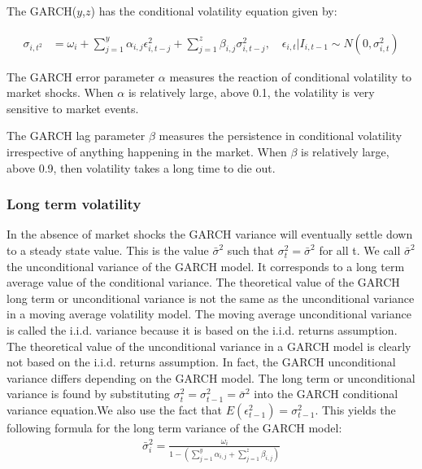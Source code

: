 The GARCH($y$,$z$) has the conditional volatility equation given by:

\begin{align}
    \sigma_{i,t^2} &= \omega_i + \sum_{j=1}^y\alpha_{i,j}\epsilon_{i,t-j}^2+\sum_{j=1}^z\beta_{i,j}\sigma_{i,t-j}^2,\quad\epsilon_{i,t} | I_{i,t-1} \sim N(0,{\sigma_{i,t}^2}) \label{ConditionalVolatilityEquation}
\end{align}

The GARCH error parameter $\alpha$ measures the reaction of conditional volatility to market shocks. When $\alpha$ is relatively large, above 0.1, the volatility is very sensitive to market events.

The GARCH lag parameter $\beta$ measures the persistence in conditional volatility irrespective of anything happening in the market. When $\beta$ is relatively large, above 0.9, then volatility takes a long time to die out.

\subsubsection{Long term volatility}

In the absence of market shocks the GARCH variance will eventually settle down to a steady state value. This is the value $\bar{\sigma}^2$ such that ${\sigma_t^2} = \bar{\sigma}^2$ for all t. We call $\bar{\sigma}^2$ the unconditional variance of the GARCH model. It corresponds to a long term average value of the conditional variance. The theoretical value of the GARCH long term or unconditional variance is not the same as the unconditional variance in a moving average volatility model. The moving average unconditional variance is called the i.i.d. variance because it is based on the i.i.d. returns assumption. The theoretical value of the unconditional variance in a GARCH model is clearly not based on the i.i.d. returns assumption. In fact, the GARCH unconditional variance differs depending on the GARCH model. The long term or unconditional variance is found by substituting ${\sigma_t^2} = {\sigma_{t-1}^2} = \bar{\sigma}^2$ into the GARCH conditional variance equation.We also use the fact that $E(\epsilon_{t-1}^2)=\sigma_{t-1}^2$. This yields the following formula for the long term variance of the GARCH model:
\begin{align}
    \bar{\sigma}_i^2=\frac{\omega_i}{1-(\sum_{j=1}^y\alpha_{i,j}+\sum_{j=1}^z\beta_{i,j})} \label{longTermVolatilityGARCH}
\end{align}

